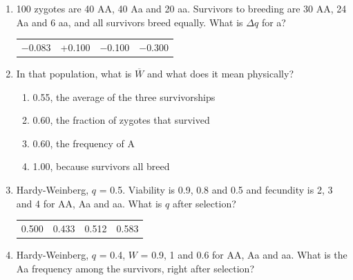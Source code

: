 \documentclass[11pt]{article}
\newcommand{\work}[1]{\par\vspace{#1}}
\begin{document}
\begin{enumerate}[label=\textbf{\arabic*.}, leftmargin=2em, itemsep=1.4em]
\item 100 zygotes are 40 AA, 40 Aa and 20 aa. Survivors to breeding are 30 AA, 24 Aa and 6 aa, and all survivors breed equally. What is \(\Delta q\) for a?
\par\smallskip\noindent\begin{tabularx}{\linewidth}{@{}YYYY@{}}
\(-\)0.083 & +0.100 & \(-\)0.100 & \(-\)0.300 \\
\end{tabularx}
\work{1.6cm}
\item In that population, what is \(\overline{W}\) and what does it mean physically?
\par\smallskip
\begin{enumerate}[label={}, leftmargin=2.4em, labelwidth=0pt, itemsep=2pt, topsep=0pt]
\item \hspace*{-2.4em}0.55, the average of the three survivorships
\item \hspace*{-2.4em}0.60, the fraction of zygotes that survived
\item \hspace*{-2.4em}0.60, the frequency of A
\item \hspace*{-2.4em}1.00, because survivors all breed
\end{enumerate}
\item Hardy-Weinberg, \(q\) = 0.5. Viability is 0.9, 0.8 and 0.5 and fecundity is 2, 3 and 4 for AA, Aa and aa. What is \(q\) after selection?
\par\smallskip\noindent\begin{tabularx}{\linewidth}{@{}YYYY@{}}
0.500 & 0.433 & 0.512 & 0.583 \\
\end{tabularx}
\work{1.6cm}
\item Hardy-Weinberg, \(q\) = 0.4, \(W\) = 0.9, 1 and 0.6 for AA, Aa and aa. What is the Aa frequency among the survivors, right after selection?
\par\smallskip\noindent\begin{tabularx}{\linewidth}{@{}YYYY@{}}

\end{tabularx}
\end{enumerate}
\end{document}
